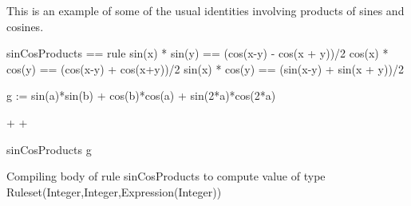 {\begin{xtc}
\begin{xtccomment}
This is an example of some of the usual identities involving products of
sines and cosines.
\end{xtccomment}
\begin{spadsrc}
sinCosProducts == rule
  sin(x) * sin(y) == (cos(x-y) - cos(x + y))/2
  cos(x) * cos(y) == (cos(x-y) + cos(x+y))/2
  sin(x) * cos(y) == (sin(x-y) + sin(x + y))/2
\end{spadsrc}
\end{xtc}
\begin{xtc}
\begin{xtccomment}
\end{xtccomment}
\begin{spadsrc}
g := sin(a)*sin(b) + cos(b)*cos(a) + sin(2*a)*cos(2*a) 
\end{spadsrc}
\begin{TeXOutput}
\begin{fricasmath}{13}
\TIMES {}+%
\TIMES {}+\TIMES {}%
\end{fricasmath}
\end{TeXOutput}
\end{xtc}
\begin{xtc}
\begin{xtccomment}
\end{xtccomment}
\begin{spadsrc}
sinCosProducts g 
\end{spadsrc}
\begin{MessageOutput}
   Compiling body of rule sinCosProducts to compute value of type 
      Ruleset(Integer,Integer,Expression(Integer)) 
\end{MessageOutput}
\begin{TeXOutput}
\begin{fricasmath}{14}
%
\end{fricasmath}
\end{TeXOutput}
\end{xtc}

}
